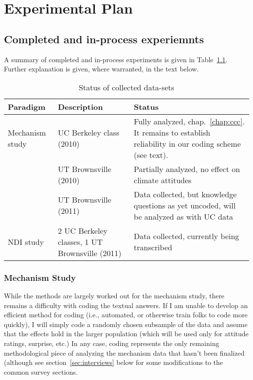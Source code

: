 \chapter{Experimental Plan}

\section{Completed and in-process experiemnts}

A summary of completed and in-process experiments is given in
Table~\ref{table:collected}. Further explanation is given, where warranted, in
the text below.

\begin{table}
\begin{tabular}{lp{}p{}}
Paradigm & Description & Status \\ 
\hline \hline
Mechanism study 
    & UC Berkeley class (2010) & Fully analyzed, chap.~\ref{chap:ccc}. It
    remains to establish reliability in our coding scheme (see text). \\
    & UT Brownsville (2010) & Partially analyzed, no effect on climate attitudes \\
    & UT Brownsville (2011) & Data collected, but knowledge questions as yet
        uncoded, will be analyzed as with UC data \\

NDI study 
    & 2 UC Berkeley classes, 1 UT Brownsville (2011) & Data collected, currently
        being transcribed \\
\hline
\end{tabular}
\caption{Status of collected data-sets}
\label{table:collected}
\end{table}


\subsection{Mechanism Study}

While the methods are largely worked out for the mechanism study, there remains
a difficulty with coding the textual answers. If I am unable to develop an
efficient method for coding (i.e., automated, or otherwise train folks to code
more quickly), I will simply code a randomly chosen subsample of the data and
assume that the effects hold in the larger population (which will be used only
for attitude ratings, surprise, etc.) In any case, coding represents the only
remaining methodological piece of analyzing the mechanism data that hasn't been
finalized (although see section~\ref{sec:interviews} below for some
modifications to the common survey sections.

